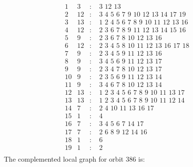 \documentclass[12pt]{article}
\begin{document}
\begin{equation*}
\begin{array}{rrcl}
1&3&:&\,\,3\,\,12\,\,13\\
2&12&:&\,\,3\,\,4\,\,5\,\,6\,\,7\,\,9\,\,10\,\,12\,\,13\,\,14\,\,17\,\,19\\
3&13&:&\,\,1\,\,2\,\,4\,\,5\,\,6\,\,7\,\,8\,\,9\,\,10\,\,11\,\,12\,\,13\,\,16\\
4&12&:&\,\,2\,\,3\,\,6\,\,7\,\,8\,\,9\,\,11\,\,12\,\,13\,\,14\,\,15\,\,16\\
5&9&:&\,\,2\,\,3\,\,6\,\,7\,\,8\,\,10\,\,12\,\,13\,\,16\\
6&12&:&\,\,2\,\,3\,\,4\,\,5\,\,8\,\,10\,\,11\,\,12\,\,13\,\,16\,\,17\,\,18\\
7&9&:&\,\,2\,\,3\,\,4\,\,5\,\,9\,\,11\,\,12\,\,13\,\,16\\
8&9&:&\,\,3\,\,4\,\,5\,\,6\,\,9\,\,11\,\,12\,\,13\,\,17\\
9&9&:&\,\,2\,\,3\,\,4\,\,7\,\,8\,\,10\,\,12\,\,13\,\,17\\
10&9&:&\,\,2\,\,3\,\,5\,\,6\,\,9\,\,11\,\,12\,\,13\,\,14\\
11&9&:&\,\,3\,\,4\,\,6\,\,7\,\,8\,\,10\,\,12\,\,13\,\,14\\
12&13&:&\,\,1\,\,2\,\,3\,\,4\,\,5\,\,6\,\,7\,\,8\,\,9\,\,10\,\,11\,\,13\,\,17\\
13&13&:&\,\,1\,\,2\,\,3\,\,4\,\,5\,\,6\,\,7\,\,8\,\,9\,\,10\,\,11\,\,12\,\,14\\
14&7&:&\,\,2\,\,4\,\,10\,\,11\,\,13\,\,16\,\,17\\
15&1&:&\,\,4\\
16&7&:&\,\,3\,\,4\,\,5\,\,6\,\,7\,\,14\,\,17\\
17&7&:&\,\,2\,\,6\,\,8\,\,9\,\,12\,\,14\,\,16\\
18&1&:&\,\,6\\
19&1&:&\,\,2\\
\end{array}
\end{equation*}
The complemented local graph for orbit $386$ is:
\end{document}
